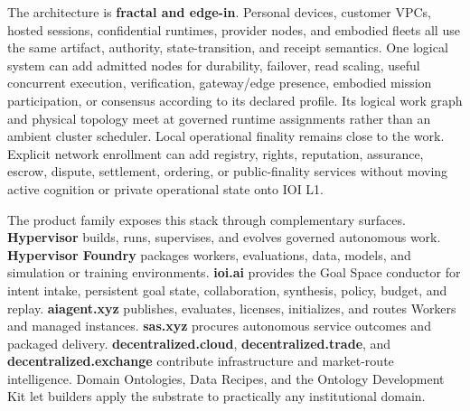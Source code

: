 \documentclass[
  11pt,
]{article}
\begin{document}
The architecture is \textbf{fractal and edge-in}. Personal devices, customer
VPCs, hosted sessions, confidential runtimes, provider nodes, and embodied
fleets all use the same artifact, authority, state-transition, and receipt
semantics. One logical system can add admitted nodes for durability, failover,
read scaling, useful concurrent execution, verification, gateway/edge presence,
embodied mission participation, or consensus according to its declared profile.
Its logical work graph and physical topology meet at governed runtime
assignments rather than an ambient cluster scheduler. Local operational
finality remains close to the work. Explicit
network enrollment can add registry, rights, reputation, assurance, escrow,
dispute, settlement, ordering, or public-finality services without moving
active cognition or private operational state onto IOI L1.

The product family exposes this stack through complementary surfaces.
\textbf{Hypervisor} builds, runs, supervises, and evolves governed autonomous
work. \textbf{Hypervisor Foundry} packages workers, evaluations, data, models,
and simulation or training environments. \textbf{ioi.ai} provides the Goal
Space conductor for intent intake, persistent goal state, collaboration,
synthesis, policy, budget, and replay. \textbf{aiagent.xyz} publishes, evaluates,
licenses, initializes, and routes Workers and managed instances.
\textbf{sas.xyz} procures autonomous service outcomes and packaged delivery.
\textbf{decentralized.cloud}, \textbf{decentralized.trade}, and
\textbf{decentralized.exchange} contribute infrastructure and market-route
intelligence. Domain Ontologies, Data Recipes, and the Ontology Development
Kit let builders apply the substrate to practically any institutional domain.
\end{document}
